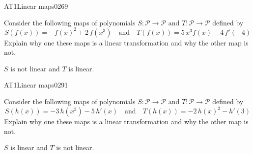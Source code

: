 \begin{exercise}{AT1}{Linear maps}{0269} 
\begin{exerciseStatement} 

 Consider the following maps of polynomials \(S:\mathcal{P}\rightarrow\mathcal{P}\) and \(T:\mathcal{P}\rightarrow\mathcal{P}\) defined by \[
            S(f(x))=
                    -f\left(x\right)^{2} + 2 \, f\left(x^{3}\right)
                \hspace{1em} \text{and} \hspace{1em}
            T(f(x))=
                    5 \, x^{3} f\left(x\right) - 4 \, f'\left(-4\right)
        \] Explain why one these maps is a linear transformation and why the other map is not. 

 \end{exerciseStatement}
 \begin{exerciseAnswer} 

\(S\) is not linear and \(T\) is linear.

 \end{exerciseAnswer}
 \end{exercise}



\begin{exercise}{AT1}{Linear maps}{0291} 
\begin{exerciseStatement} 

 Consider the following maps of polynomials \(S:\mathcal{P}\rightarrow\mathcal{P}\) and \(T:\mathcal{P}\rightarrow\mathcal{P}\) defined by \[
            S(h(x))=
                    -3 \, h\left(x^{3}\right) - 5 \, h'\left(x\right)
                \hspace{1em} \text{and} \hspace{1em}
            T(h(x))=
                    -2 \, h\left(x\right)^{2} - h'\left(3\right)
        \] Explain why one these maps is a linear transformation and why the other map is not. 

 \end{exerciseStatement}
 \begin{exerciseAnswer} 

\(S\) is linear and \(T\) is not linear.

 \end{exerciseAnswer}
 \end{exercise}


\newpage




